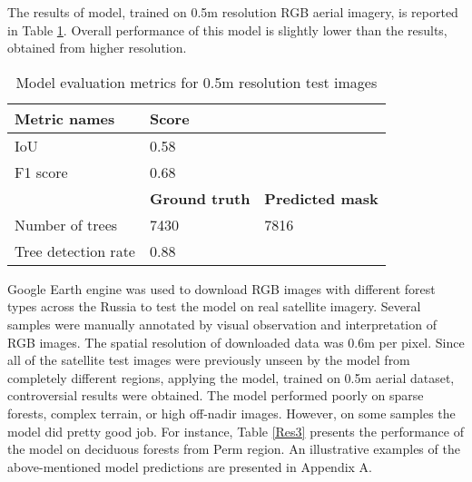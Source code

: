 The results of model, trained on 0.5m resolution RGB aerial imagery, is reported in Table \ref{Res2}. Overall performance of this model is slightly lower than the results, obtained from higher resolution. 

\begin{table}[h]
\caption{Model evaluation metrics for 0.5m resolution test images}
\label{Res2}
\vskip 0.15in
\begin{center}
\begin{small}
\begin{sc}
\begin{tabular}{lp{4cm}p{4cm}}
\hline
\textbf{Metric names} & \textbf{Score} & \\\hline
\gls{IoU} &0.58  & \\
F1 score &0.68  & \\\hline
&\textbf{Ground truth}  & \textbf{Predicted mask}\\\hline
Number of trees &7430  & 7816\\
Tree detection rate &0.88  & \\\hline
\end{tabular}
\end{sc}
\end{small}
\end{center}
\vskip -0.1in
\end{table}

\newpage
Google Earth engine was used to download RGB images with different forest types across the Russia to test the model on real satellite imagery. Several samples were manually annotated by visual observation and interpretation of RGB images. The spatial resolution of downloaded data was 0.6m per pixel. Since all of the satellite test images were previously unseen by the model from completely different regions, applying the model, trained on 0.5m aerial dataset, controversial results were obtained. The model performed poorly on sparse forests, complex terrain, or high off-nadir images. However, on some samples the model did pretty good job. For instance, Table \ref{Res3} presents the performance of the model on deciduous forests from Perm region. An illustrative examples of the above-mentioned model predictions are presented in Appendix A. 

